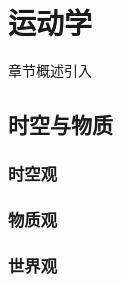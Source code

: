 \chapter{运动学}\label{2}

章节概述引入

\section{时空与物质}\label{2-1}

\subsection{时空观}\label{2-1-1}

\subsection{物质观}\label{2-1-2}

\subsection{世界观}\label{2-1-3}